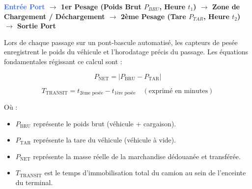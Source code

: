 \documentclass[12pt,a4paper,oneside]{report}
\begin{document}
\begin{center}
\begin{tcolorbox}[colback=lightbg,colframe=royalblue,arc=4pt,width=0.98\textwidth]
\centering \small \bfseries
\textcolor{royalblue}{Entrée Port} $\longrightarrow$ \textcolor{navyblue}{1er Pesage (Poids Brut $P_{BRU}$, Heure $t_1$)} $\longrightarrow$ \textcolor{marsaorange}{Zone de Chargement / Déchargement} $\longrightarrow$ \textcolor{navyblue}{2ème Pesage (Tare $P_{TAR}$, Heure $t_2$)} $\longrightarrow$ \textcolor{emeraldgreen}{Sortie Port}
\end{tcolorbox}
\end{center}

Lors de chaque passage sur un pont-bascule automatisé, les capteurs de pesée enregistrent le poids du véhicule et l'horodatage précis du passage. Les équations fondamentales régissant ce calcul sont :

\begin{equation}
P_{\text{NET}} = |P_{\text{BRU}} - P_{\text{TAR}}|
\end{equation}

\begin{equation}
T_{\text{TRANSIT}} = t_{\text{2ème pesée}} - t_{\text{1ère pesée}} \quad (\text{exprimé en minutes})
\end{equation}

Où :
\begin{itemize}
    \item $P_{\text{BRU}}$ représente le poids brut (véhicule + cargaison).
    \item $P_{\text{TAR}}$ représente la tare du véhicule (véhicule à vide).
    \item $P_{\text{NET}}$ représente la masse réelle de la marchandise dédouanée et transférée.
    \item $T_{\text{TRANSIT}}$ est le temps d'immobilisation total du camion au sein de l'enceinte du terminal.
\end{itemize}
\end{document}
